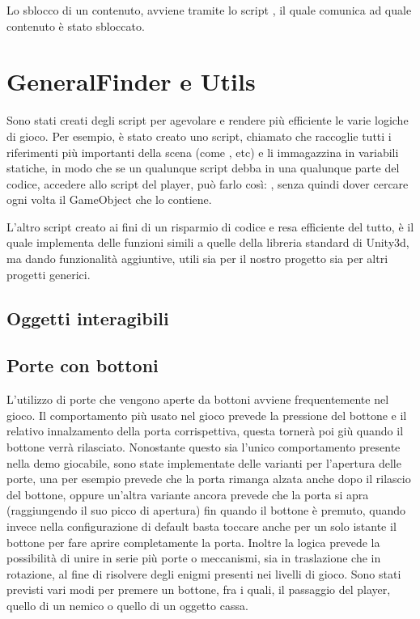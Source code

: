 Lo sblocco di un contenuto, avviene tramite lo script , il quale comunica ad  quale contenuto è stato sbloccato.

\section{GeneralFinder e Utils}

Sono stati creati degli script per agevolare e rendere più efficiente le varie logiche di gioco. Per esempio, è stato creato uno script, chiamato  che raccoglie tutti i riferimenti più importanti della scena (come ,  etc) e li immagazzina in variabili statiche, in modo che se un qualunque script debba in una qualunque parte del codice, accedere allo script del player, può farlo così: , senza quindi dover cercare ogni volta il GameObject che lo contiene.

L'altro script creato ai fini di un risparmio di codice e resa efficiente del tutto, è  il quale implementa delle funzioni simili a quelle della libreria standard di Unity3d, ma dando funzionalità aggiuntive, utili sia per il nostro progetto sia per altri progetti generici.

\subsection{Oggetti interagibili}

\subsection{Porte con bottoni}

L'utilizzo di porte che vengono aperte da bottoni avviene frequentemente nel gioco. Il comportamento più usato nel gioco prevede la pressione del bottone e il relativo innalzamento della porta corrispettiva, questa tornerà poi giù quando il bottone verrà rilasciato. Nonostante questo sia l'unico comportamento presente nella demo giocabile, sono state implementate delle varianti per l'apertura delle porte, una per esempio prevede che la porta rimanga alzata anche dopo il rilascio del bottone, oppure un'altra variante ancora prevede che la porta si apra (raggiungendo il suo picco di apertura) fin quando il bottone è premuto, quando invece nella configurazione di default basta toccare anche per un solo istante il bottone per fare aprire completamente la porta. Inoltre la logica prevede la possibilità di unire in serie più porte o meccanismi, sia in traslazione che in rotazione, al fine di risolvere degli enigmi presenti nei livelli di gioco. Sono stati previsti vari modi per premere un bottone, fra i quali, il passaggio del player, quello di un nemico o quello di un oggetto cassa.

